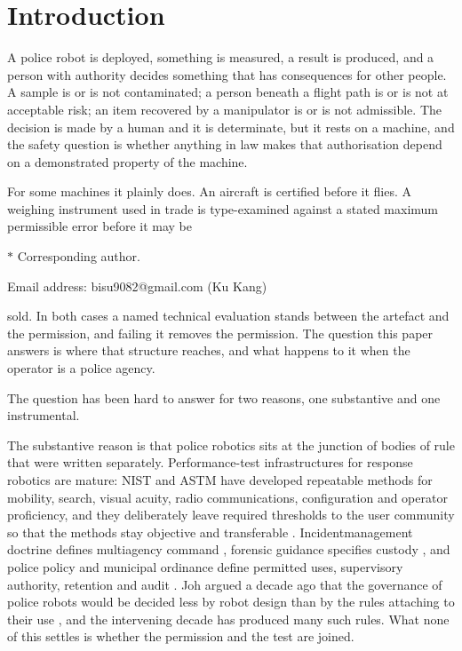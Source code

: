 \section{Introduction}\label{sec:1}

A police robot is deployed, something is measured, a result is produced, and a person with authority decides something that has consequences for other people. A sample is or is not contaminated; a person beneath a flight path is or is not at acceptable risk; an item recovered by a manipulator is or is not admissible. The decision is made by a human and it is determinate, but it rests on a machine, and the safety question is whether anything in law makes that authorisation depend on a demonstrated property of the machine.

For some machines it plainly does. An aircraft is certified before it flies. A weighing instrument used in trade is type-examined against a stated maximum permissible error before it may be

$*$ Corresponding author.

Email address: bisu9082@gmail.com (Ku Kang)

sold. In both cases a named technical evaluation stands between the artefact and the permission, and failing it removes the permission. The question this paper answers is where that structure reaches, and what happens to it when the operator is a police agency.

The question has been hard to answer for two reasons, one substantive and one instrumental.

The substantive reason is that police robotics sits at the junction of bodies of rule that were written separately. Performance-test infrastructures for response robotics are mature: NIST and ASTM have developed repeatable methods for mobility, search, visual acuity, radio communications, configuration and operator proficiency, and they deliberately leave required thresholds to the user community so that the methods stay objective and transferable \citep{NISTResponseRobots2026,ASTME2853_22,ASTME2854_21,ASTME2855_2021,ASTME2566_24,ASTME3132_2025}. Incidentmanagement doctrine defines multiagency command \citep{FEMANIMS2026,FEMAUSFANIMSResource2026}, forensic guidance specifies custody \citep{NIJChainCustody}, and police policy and municipal ordinance define permitted uses, supervisory authority, retention and audit \citep{NYPDPOSTAct2026,NYPDTacticalRobots2026,NYCOIGPOST2024}. Joh argued a decade ago that the governance of police robots would be decided less by robot design than by the rules attaching to their use \citep{Joh2016PolicingPoliceRobots}, and the intervening decade has produced many such rules. What none of this settles is whether the permission and the test are joined.

